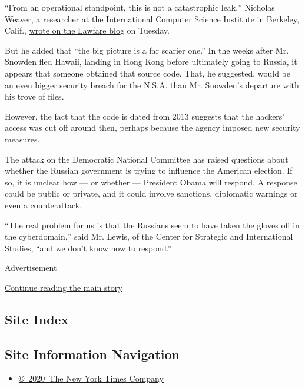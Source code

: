 ``From an operational standpoint, this is not a catastrophic leak,''
Nicholas Weaver, a researcher at the International Computer Science
Institute in Berkeley, Calif.,
\href{https://www.lawfareblog.com/very-bad-monday-nsa-0}{wrote on the
Lawfare blog} on Tuesday.

But he added that ``the big picture is a far scarier one.'' In the weeks
after Mr. Snowden fled Hawaii, landing in Hong Kong before ultimately
going to Russia, it appears that someone obtained that source code.
That, he suggested, would be an even bigger security breach for the
N.S.A. than Mr. Snowden's departure with his trove of files.

However, the fact that the code is dated from 2013 suggests that the
hackers' access was cut off around then, perhaps because the agency
imposed new security measures.

The attack on the Democratic National Committee has raised questions
about whether the Russian government is trying to influence the American
election. If so, it is unclear how --- or whether --- President Obama
will respond. A response could be public or private, and it could
involve sanctions, diplomatic warnings or even a counterattack.

``The real problem for us is that the Russians seem to have taken the
gloves off in the cyberdomain,'' said Mr. Lewis, of the Center for
Strategic and International Studies, ``and we don't know how to
respond.''

Advertisement

\protect\hyperlink{after-bottom}{Continue reading the main story}

\hypertarget{site-index}{%
\subsection{Site Index}\label{site-index}}

\hypertarget{site-information-navigation}{%
\subsection{Site Information
Navigation}\label{site-information-navigation}}

\begin{itemize}
\tightlist
\item
  \href{https://help.nytimes.com/hc/en-us/articles/115014792127-Copyright-notice}{©~2020~The
  New York Times Company}
\end{itemize}

